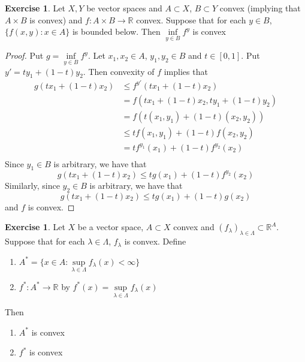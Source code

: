 \documentclass[12pt]{amsart}
\theoremstyle{definition}
\newtheorem{ex}[definition]{Exercise}
\newcommand{\lam}{\lambda}
\newcommand{\Lam}{\Lambda}
\newcommand{\R}{\mathbb{R}}
\newcommand{\lex}[1]{\label{ex:#1}}
\begin{document}
	\begin{ex} \lex{91014}
	Let $X, Y$ be vector spaces and $A \subset X$, $B \subset Y$ convex (implying that $A \times B$ is convex)  and $f:A \times B \rightarrow \R$ convex. Suppose that for each $y \in B$, $\{f(x, y): x \in A\}$ is bounded below. Then $\inf\limits_{y \in B}f^y$ is convex
	\end{ex}
	
	\begin{proof}
	Put $g = \inf\limits_{y \in B}f^y$. 
	Let $x_1, x_2 \in A$, $y_1, y_2 \in B$ and $t \in [0,1]$. Put $y'= ty_1 + (1-t)y_2$. Then convexity of $f$ implies that
	\begin{align*}
	g(tx_1 + (1-t)x_2) 
	& \leq f^{y'}(tx_1 + (1-t)x_2) \\
	&= f(tx_1 + (1-t)x_2, ty_1 + (1-t)y_2)\\
	&= f(t(x_1,y_1) + (1-t)(x_2, y_2)) \\
	& \leq tf(x_1, y_1) + (1-t)f(x_2, y_2) \\
	&= tf^{y_1}(x_1) + (1-t)f^{y_2}(x_2) \\
	\end{align*}
	Since $y_1 \in B$ is arbitrary, we have that $$g(tx_1 + (1-t)x_2) \leq tg(x_1) + (1-t)f^{y_2}(x_2)$$ Similarly, since $y_2 \in B$ is arbitrary, we have that $$g(tx_1 + (1-t)x_2) \leq tg(x_1) + (1-t)g(x_2)$$ and $f$ is convex.
	\end{proof}	

	\begin{ex} \lex{91015}
	Let $X$ be a vector space, $A \subset X$ convex and $ (f_{\lam})_{\lam \in \Lam} \subset \R^A$. Suppose that for each $\lam \in \Lam$, $f_\lam$ is convex. Define 
	\begin{enumerate}
		\item $A^* = \{x \in A: \sup\limits_{\lam \in \Lam} f_{\lam}(x) < \infty\}$
		\item $f^*:A^* \rightarrow \R$ by $f^*(x) =  \sup\limits_{\lam \in \Lam} f_{\lam}(x)$
	\end{enumerate}
Then
	\begin{enumerate}
		\item $A^*$ is convex 
		\item $f^*$ is convex
	\end{enumerate}
	\end{ex}
	
\end{document}
